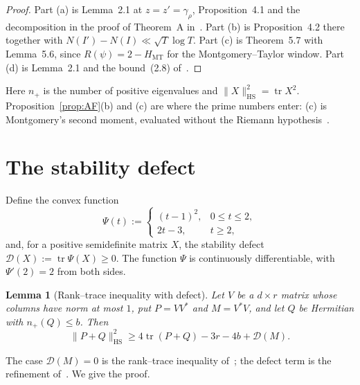 \documentclass[aps,prd,twocolumn,superscriptaddress,nofootinbib,longbibliography,floatfix,showkeys,amsmath,amssymb,10pt]{revtex4-2}
\newtheorem{lemma}[theorem]{Lemma}
\theoremstyle{definition}
\theoremstyle{remark}
\newcommand{\cD}{\mathcal{D}}
\newcommand{\HS}{\mathrm{HS}}
\newcommand{\MT}{\mathrm{MT}}
\DeclareMathOperator{\tr}{tr}
\begin{document}
\begin{proof}
Part (a) is Lemma~2.1 at $z=z'=\gamma_\rho$, Proposition~4.1 and the
decomposition in the proof of Theorem~A in~\cite{AF26}. Part (b) is
Proposition~4.2 there together with $N(I')-N(I)\ll\sqrt T\log T$. Part (c)
is Theorem~5.7 with Lemma~5.6, since $R(\psi)=2-H_\MT$ for the
Montgomery--Taylor window. Part (d) is Lemma~2.1 and the bound~(2.8)
of~\cite{AF26}.
\end{proof}

Here $n_+$ is the number of positive eigenvalues and $\|X\|_\HS^2=\tr X^2$.
Proposition~\ref{prop:AF}(b) and (c) are where the prime numbers enter:
(c) is Montgomery's second moment, evaluated without the Riemann
hypothesis~\cite{BGSTB24}.

\section{The stability defect}\label{sec:stability}

Define the convex function
\[
 \Psi(t):=\begin{cases}(t-1)^2,&0\le t\le2,\\ 2t-3,&t\ge2,\end{cases}
\]
and, for a positive semidefinite matrix $X$, the stability defect
$\cD(X):=\tr\Psi(X)\ge0$. The function $\Psi$ is continuously
differentiable, with $\Psi'(2)=2$ from both sides.

\begin{lemma}[Rank--trace inequality with defect]\label{lem:stable}
Let $V$ be a $d\times r$ matrix whose columns have norm at most $1$, put
$P=VV^*$ and $M=V^*V$, and let $Q$ be Hermitian with $n_+(Q)\le b$. Then
\[
 \|P+Q\|_\HS^2\ge4\tr(P+Q)-3r-4b+\cD(M).
\]
\end{lemma}

The case $\cD(M)=0$ is the rank--trace inequality of~\cite[Lemma 3.2]{AF26};
the defect term is the refinement of~\cite{Ain26}. We give the proof.
\end{document}
